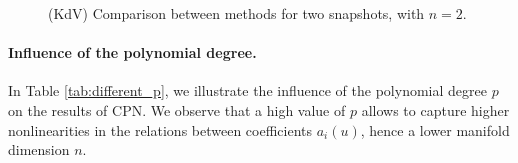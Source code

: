 \begin{figure}
    \centering
    \caption{(KdV) Comparison between methods for two snapshots, with  $ n = 2 $.}
    \label{fig:kdv_snapshots}
\end{figure}



\paragraph{Influence of the polynomial degree.}

In Table \ref{tab:different_p}, we illustrate the influence of the polynomial degree $p$ on the results of CPN. We observe that a high value of $p$ allows to capture higher nonlinearities in the relations between coefficients $a_i(u)$, hence a lower manifold dimension $n$. 




